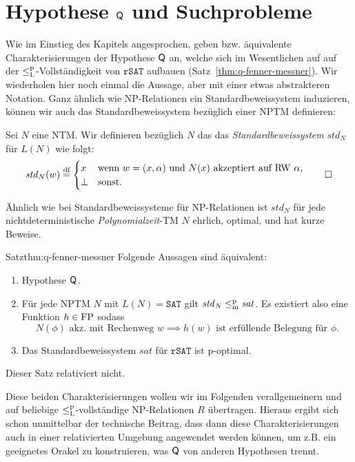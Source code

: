 \section{Hypothese $\mathsf{Q}$ und Suchprobleme}\label{sec:q-vs-search}

Wie im Einstieg des Kapitels angesprochen, geben \textcite{fenner_inverting_2003} bzw. \textcite{messner_simulation_2001} äquivalente Charakterisierungen der Hypothese $\mathsf{Q}$ an, welche sich im Wesentlichen auf auf der $\leq_\mathrm{L}^\mathrm{p}$-Vollständigkeit von $\mathtt{rSAT}$ aufbauen (Satz~\ref{thm:q-fenner-messner}).
Wir wiederholen hier noch einmal die Aussage, aber mit einer etwas abstrakteren Notation.
Ganz ähnlich wie NP-Relationen ein Standardbeweissystem induzieren, können wir auch das Standardbeweissystem bezüglich einer NPTM definieren:
\begin{definition}
    Sei $N$ eine NTM. Wir definieren bezüglich $N$ das das \emph{Standardbeweissystem} $\mathit{std}_N$ für $L(N)$ wie folgt:
    \[ \mathit{std}_N(w) \stackrel{\text{df}}{=} \begin{cases} x & \text{wenn $w=(x,\alpha)$ und $N(x)$ akzeptiert auf RW $\alpha$,}\\
    \bot & \text{sonst}.\end{cases} \qedhere \] 
\end{definition}
Ähnlich wie bei Standardbeweissysteme für NP-Relationen ist $\mathit{std}_N$ für jede nichtdeterministische \emph{Polynomialzeit}-TM $N$ ehrlich, optimal, und hat kurze Beweise.
\begin{reptheorem}{Satz}{thm:q-fenner-messner}
    Folgende Aussagen sind äquivalent:
    \begin{enumerate}
        \item Hypothese $\mathsf{Q}$.
        \item Für jede NPTM $N$ mit $L(N)=\mathtt{SAT}$ gilt $\mathit{std}_N\leq_\mathrm{m}^\mathrm{p} \mathit{sat}$. Es existiert also eine Funktion $h\in \mathrm{FP}$ sodass 
            \[ N(\phi) \text{ akz. mit Rechenweg $w$} \implies \text{$h(w)$ ist erfüllende Belegung für $\phi$}. \]
        \item Das Standardbeweissystem $\mathit{sat}$ für $\mathtt{rSAT}$ ist p-optimal.
    \end{enumerate}
    Dieser Satz relativiert nicht.
\end{reptheorem}

Diese beiden Charakterisierungen wollen wir im Folgenden verallgemeinern und auf beliebige $\leq_\mathrm{L}^\mathrm{p}$-vollständige NP-Relationen $R$ übertragen. 
Hieraus ergibt sich schon unmittelbar der technische Beitrag, dass dann diese Charakterisierungen auch in einer relativierten Umgebung angewendet werden können, um z.B. ein geeignetes Orakel zu konstruieren, was $\mathsf{Q}$ von anderen Hypothesen trennt.

